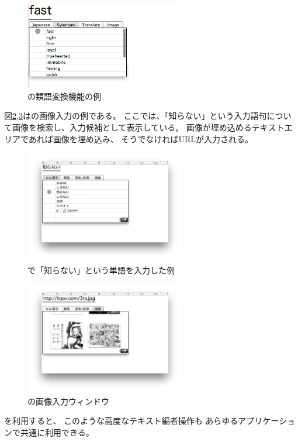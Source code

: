 \begin{figure}[H]
\centerline{\includegraphics[width=70mm,bb=0 0 350 250]{figures/synonym.png}}
\caption{{\system}の類語変換機能の例}
\label{synonym}
\end{figure}

図\ref{image1},\ref{image2}は{\system}の画像入力の例である。
ここでは、「知らない」という入力語句について画像を検索し、入力候補として表示している。
画像が埋め込めるテキストエリアであれば画像を埋め込み、
そうでなければURLが入力される。

\begin{figure}[H]
\centerline{\includegraphics[width=70mm,bb=0 0 600 400]{figures/image1.png}}
\caption{{\system}で「知らない」という単語を入力した例}
\label{image1}
\end{figure}

\begin{figure}[H]
\centerline{\includegraphics[width=70mm,bb=0 0 600 400]{figures/image2.png}}
\caption{{\system}の画像入力ウィンドウ}
\label{image2}
\end{figure}

{\system}を利用すると、
このような高度なテキスト編者操作も
あらゆるアプリケーションで共通に利用できる。

